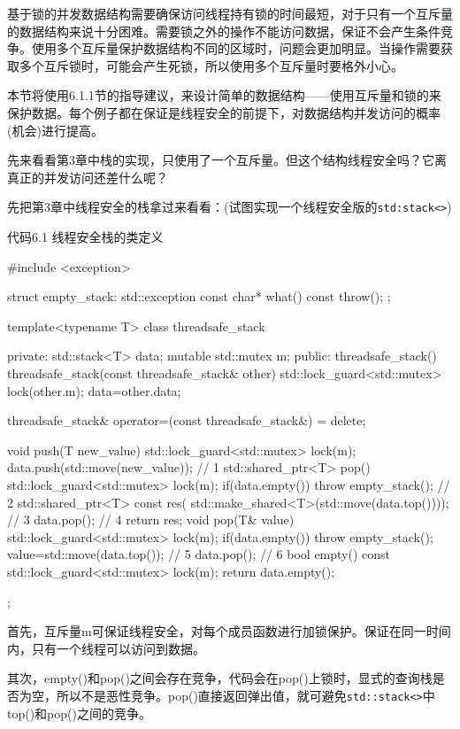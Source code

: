 
基于锁的并发数据结构需要确保访问线程持有锁的时间最短，对于只有一个互斥量的数据结构来说十分困难。需要锁之外的操作不能访问数据，保证不会产生条件竞争。使用多个互斥量保护数据结构不同的区域时，问题会更加明显。当操作需要获取多个互斥锁时，可能会产生死锁，所以使用多个互斥量时要格外小心。

本节将使用6.1.1节的指导建议，来设计简单的数据结构——使用互斥量和锁的来保护数据。每个例子都在保证是线程安全的前提下，对数据结构并发访问的概率(机会)进行提高。

先来看看第3章中栈的实现，只使用了一个互斥量。但这个结构线程安全吗？它离真正的并发访问还差什么呢？


先把第3章中线程安全的栈拿过来看看：(试图实现一个线程安全版的\texttt{std:stack<>})

代码6.1 线程安全栈的类定义

\begin{cpp}
#include <exception>

struct empty_stack: std::exception
{
  const char* what() const throw();
};

template<typename T>
class threadsafe_stack
{
private:
  std::stack<T> data;
  mutable std::mutex m;
public:
  threadsafe_stack(){}
  threadsafe_stack(const threadsafe_stack& other)
  {
    std::lock_guard<std::mutex> lock(other.m);
    data=other.data;
  }

  threadsafe_stack& operator=(const threadsafe_stack&) = delete;

  void push(T new_value)
  {
    std::lock_guard<std::mutex> lock(m);
    data.push(std::move(new_value));  // 1
  }
  std::shared_ptr<T> pop()
  {
    std::lock_guard<std::mutex> lock(m);
    if(data.empty()) throw empty_stack();  // 2
    std::shared_ptr<T> const res(
      std::make_shared<T>(std::move(data.top())));  // 3
    data.pop();  // 4
    return res;
  }
  void pop(T& value)
  {
    std::lock_guard<std::mutex> lock(m);
    if(data.empty()) throw empty_stack();
    value=std::move(data.top());  // 5
    data.pop();  // 6
  }
  bool empty() const
  {
    std::lock_guard<std::mutex> lock(m);
    return data.empty();
  }
};
\end{cpp}

首先，互斥量m可保证线程安全，对每个成员函数进行加锁保护。保证在同一时间内，只有一个线程可以访问到数据。

其次，empty()和pop()之间会存在竞争，代码会在pop()上锁时，显式的查询栈是否为空，所以不是恶性竞争。pop()直接返回弹出值，就可避免\texttt{std::stack<>}中top()和pop()之间的竞争。

